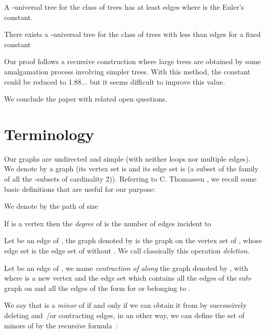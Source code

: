 \documentclass{llncs}
\begin{document}
\begin{theorem}\label{th1} A -universal tree for the class of trees has
at least  edges where  is
the Euler's constant.
\end{theorem}


\begin{theorem} \label{th2} There exists a -universal tree  for the
class of trees with less than  edges for a fixed constant 
\end{theorem}
Our proof follows a recursive
construction where large trees are obtained by some amalgamation
process involving simpler trees. With this method, the constant
 could be reduced to 1.88... but it seems difficult to improve
this value.





We conclude the paper with related open questions.





\section{Terminology}





Our graphs are undirected and simple (with neither loops nor
multiple edges). We denote by  a graph (its vertex set is
 and its edge set is  (a subset of the family of all
the -subsets of cardinality 2)). Referring to C. Thomassen
\cite{Th}, we recall some basic definitions that are useful for
our purpose:

We denote by  the path of size 

If  is a vertex then  the \textit{degree} of  is the number of edges incident to


Let  be an edge of , the graph denoted by  is the
graph on the vertex set of , whose edge set is the edge set of
 without . We call classically this operation
\textit{deletion}.

Let  be an edge of , we name
\textit{contraction of }\textit{ along } the graph denoted by , with  where  is a new
vertex and  the edge set which contains all the edges of the sub-graph
 on  and all the edges of the form  for
 or  belonging to .

We say that  is a \textit{minor} of  if and only if we can
obtain it from  by successively deleting and~/or contracting
edges, in an other way, we can define the set  of minors of
 by the recursive formula~:
\end{document}
